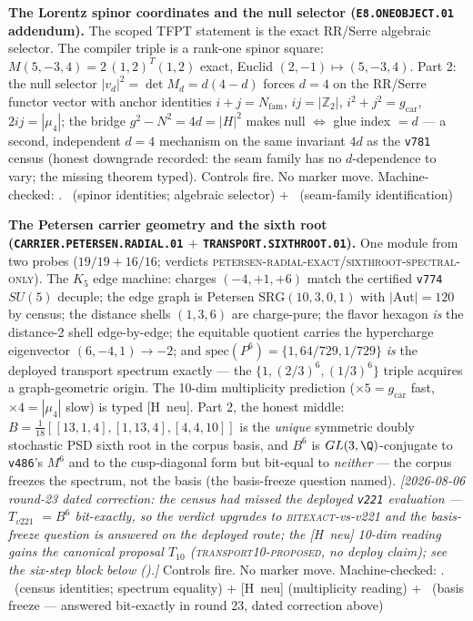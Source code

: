 \documentclass[11pt,a4paper]{article}
\newcommand{\gcar}{g_{\mathrm{car}}}
\newcommand{\Nfam}{N_{\mathrm{fam}}}
\newcommand{\Z}{\mathbb{Z}}
\theoremstyle{definition}
\begin{document}
\par\smallskip\noindent\textbf{The Lorentz spinor coordinates and
the null selector (\texttt{E8.ONEOBJECT.01} addendum).}
The scoped TFPT statement is the exact RR/Serre algebraic selector.
The compiler triple is a rank-one spinor square:
$M(5,-3,4)=2\,(1,2)^{T}(1,2)$ exact, Euclid
$(2,-1)\mapsto(5,-3,4)$.  Part 2: the null
selector $|v_d|^2=\det M_d=d(4-d)$ forces $d=4$ on the RR/Serre
functor vector with anchor identities $i{+}j=\Nfam$, $ij=|\Z_2|$,
$i^2{+}j^2=\gcar$, $2ij=|\mu_4|$; the bridge $g^2-N^2=4d=|H|^2$
makes null $\iff$ glue index $=d$ --- a second, independent $d=4$
mechanism on the same invariant $4d$ as the \texttt{v781} census
(honest downgrade recorded: the seam family has no $d$-dependence
to vary; the missing theorem typed).  Controls fire.  No marker
move.
Machine-checked: .
\mE\ (spinor identities; algebraic selector) $+$
\mO\ (seam-family identification)
\par\smallskip

\par\smallskip\noindent\textbf{The Petersen carrier geometry and
the sixth root (\texttt{CARRIER.PETERSEN.RADIAL.01} $+$
\texttt{TRANSPORT.SIXTHROOT.01}).}
One module from two probes ($19/19+16/16$; verdicts
\textsc{petersen-radial-exact}/\textsc{sixthroot-spectral-only}).
The $K_5$ edge machine: charges $(-4,+1,+6)$ match the certified
\texttt{v774} $SU(5)$ decuple; the edge graph is Petersen
$\mathrm{SRG}(10,3,0,1)$ with $|\mathrm{Aut}|=120$ by census; the distance
shells $(1,3,6)$ are charge-pure; the flavor hexagon \emph{is} the
distance-2 shell edge-by-edge; the equitable quotient carries the
hypercharge eigenvector $(6,-4,1)\to-2$; and
$\mathrm{spec}(P^6)=\{1,64/729,1/729\}$ \emph{is} the deployed
transport spectrum exactly --- the $\{1,(2/3)^6,(1/3)^6\}$ triple
acquires a graph-geometric origin.  The 10-dim multiplicity
prediction ($\times5=\gcar$ fast, $\times4=|\mu_4|$ slow) is typed
[H~neu].  Part 2, the honest middle:
$B=\tfrac1{18}[[13,1,4],[1,13,4],[4,4,10]]$ is the \emph{unique}
symmetric doubly stochastic PSD sixth root in the corpus basis, and
$B^6$ is $GL(3,\Q)$-conjugate to \texttt{v486}'s $M^6$ and to the
cusp-diagonal form but bit-equal to \emph{neither} --- the corpus
freezes the spectrum, not the basis (the basis-freeze question
named).  \emph{[2026-08-06 round-23 dated correction: the census
had missed the deployed \texttt{v221} evaluation --- $T_{v221}$
$=B^6$ \emph{bit-exactly}, so the verdict upgrades to
\textsc{bitexact}-vs-v221 and the basis-freeze question is
answered on the deployed route; the [H~neu] 10-dim reading gains
the canonical proposal $T_{10}$ (\textsc{transport10-proposed},
no deploy claim); see the six-step block below
().]}
Controls fire.  No marker move.
Machine-checked: .
\mE\ (census identities; spectrum equality) $+$ [H~neu]
(multiplicity reading) $+$ \mO\ (basis freeze --- answered
bit-exactly in round 23, dated correction above)
\par\smallskip
\end{document}
